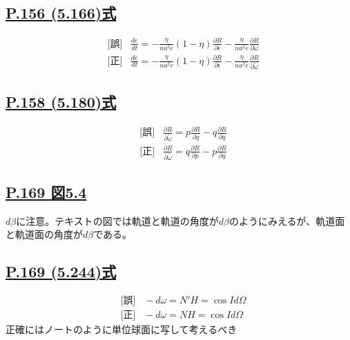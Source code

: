 \documentclass[9pt,fleqn]{bxjsarticle}
\begin{document}
\subsection*{\underline{P.156 (5.166)式}}
\begin{align*}
    &\text{[誤]} \hspace{10pt} \frac{de}{dt} = -\frac{\eta}{na^2e}\left(1-\eta\right)\frac{{\partial}R}{\partial\epsilon} - \frac{\eta}{na^2e}\frac{{\partial}R}{\partial\omega} \\
    &\text{[正]} \hspace{10pt} \frac{de}{dt} = -\frac{\eta}{na^2e}\left(1-\eta\right)\frac{{\partial}R}{\partial\epsilon} - \frac{\eta}{na^2e}\frac{{\partial}R}{\partial\tilde{\omega}} 
\end{align*}

\subsection*{\underline{P.158 (5.180)式}}
\begin{align*}
    &\text{[誤]} \hspace{10pt} \frac{\partial{R}}{\partial\tilde{\omega}} = p\frac{\partial{R}}{\partial{q}} - q\frac{\partial{R}}{\partial{q}} \\
    &\text{[正]} \hspace{10pt} \frac{\partial{R}}{\partial\tilde{\omega}} = q\frac{\partial{R}}{\partial{p}} - p\frac{\partial{R}}{\partial{q}}
\end{align*}

\subsection*{\underline{P.169 図5.4}}
$d\beta$に注意。テキストの図では軌道と軌道の角度が$d\beta$のようにみえるが、軌道面と軌道面の角度が$d\beta$である。

\subsection*{\underline{P.169 (5.244)式}}
\begin{align*}
    &\text{[誤]} \hspace{10pt} -d\omega = N'H = \cos{I}d\Omega \\
    &\text{[正]} \hspace{10pt} -d\omega = NH = \cos{I}d\Omega 
\end{align*}
正確にはノートのように単位球面に写して考えるべき
\end{document}
